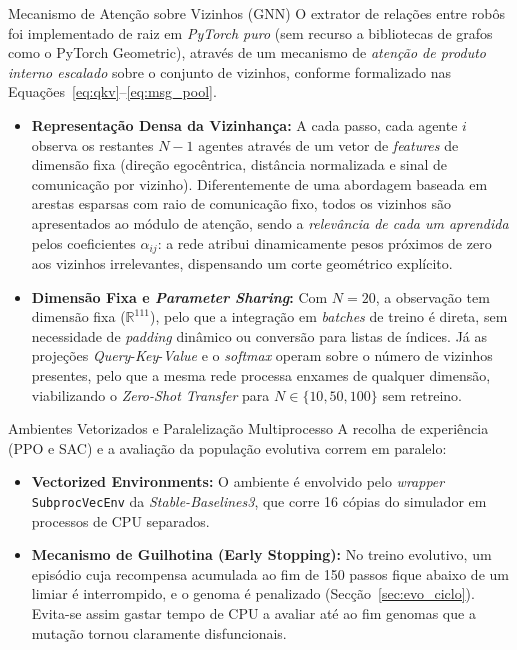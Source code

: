 \documentclass[12pt,reqno, twoside]{amsbook}
\makeatletter
\def\subsection{\@startsection{subsection}{2}%
      \z@{.5\linespacing\@plus.7\linespacing}{.25\linespacing}%
      {\normalfont\bfseries\flushleft}}
\theoremstyle{plain}
\numberwithin{equation}{chapter}
\numberwithin{section}{chapter}
\numberwithin{table}{chapter}
\numberwithin{figure}{chapter}
\makeatother
\begin{document}
\subsection{Mecanismo de Atenção sobre Vizinhos (GNN)}
O extrator de relações entre robôs foi implementado de raiz em \emph{PyTorch puro} (sem recurso a bibliotecas de grafos como o PyTorch Geometric), através de um mecanismo de \emph{atenção de produto interno escalado} sobre o conjunto de vizinhos, conforme formalizado nas Equações~\ref{eq:qkv}--\ref{eq:msg_pool}.
\begin{itemize}
    \item \textbf{Representação Densa da Vizinhança:} A cada passo, cada agente $i$ observa os restantes $N-1$ agentes através de um vetor de \textit{features} de dimensão fixa (direção egocêntrica, distância normalizada e sinal de comunicação por vizinho). Diferentemente de uma abordagem baseada em arestas esparsas com raio de comunicação fixo, todos os vizinhos são apresentados ao módulo de atenção, sendo a \emph{relevância de cada um aprendida} pelos coeficientes $\alpha_{ij}$: a rede atribui dinamicamente pesos próximos de zero aos vizinhos irrelevantes, dispensando um corte geométrico explícito.
    \item \textbf{Dimensão Fixa e \textit{Parameter Sharing}:} Com $N=20$, a observação tem dimensão fixa ($\mathbb{R}^{111}$), pelo que a integração em \textit{batches} de treino é direta, sem necessidade de \textit{padding} dinâmico ou conversão para listas de índices. Já as projeções \textit{Query}-\textit{Key}-\textit{Value} e o \textit{softmax} operam sobre o número de vizinhos presentes, pelo que a mesma rede processa enxames de qualquer dimensão, viabilizando o \textit{Zero-Shot Transfer} para $N \in \{10, 50, 100\}$ sem retreino.
\end{itemize}

\subsection{Ambientes Vetorizados e Paralelização Multiprocesso}
A recolha de experiência (PPO e SAC) e a avaliação da população evolutiva correm em paralelo:
\begin{itemize}
    \item \textbf{Vectorized Environments:} O ambiente é envolvido pelo \textit{wrapper} \texttt{SubprocVecEnv} da \textit{Stable-Baselines3}, que corre 16 cópias do simulador em processos de CPU separados.
    \item \textbf{Mecanismo de Guilhotina (Early Stopping):} No treino evolutivo, um episódio cuja recompensa acumulada ao fim de 150 passos fique abaixo de um limiar é interrompido, e o genoma é penalizado (Secção~\ref{sec:evo_ciclo}). Evita-se assim gastar tempo de CPU a avaliar até ao fim genomas que a mutação tornou claramente disfuncionais.
\end{itemize}
\end{document}
